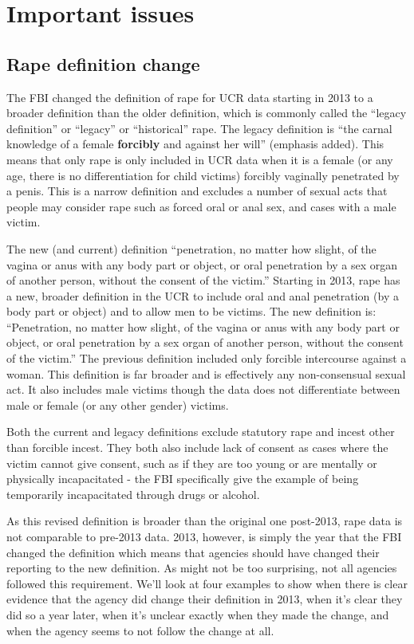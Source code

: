\documentclass[
  12pt,
  openany]{book}
\begin{document}
\hypertarget{important-issues}{%
\section{Important issues}\label{important-issues}}

\hypertarget{rape-definition-change}{%
\subsection{Rape definition change}\label{rape-definition-change}}

The FBI changed the definition of rape for UCR data starting in 2013 to a broader definition than the older definition, which is commonly called the ``legacy definition'' or ``legacy'' or ``historical'' rape. The legacy definition is ``the carnal knowledge of a female \textbf{forcibly} and against her will'' (emphasis added). This means that only rape is only included in UCR data when it is a female (or any age, there is no differentiation for child victims) forcibly vaginally penetrated by a penis. This is a narrow definition and excludes a number of sexual acts that people may consider rape such as forced oral or anal sex, and cases with a male victim.

The new (and current) definition ``penetration, no matter how slight, of the vagina or anus with any body part or object, or oral penetration by a sex organ of another person, without the consent of the victim.'' Starting in 2013, rape has a new, broader definition in the UCR to include oral and anal penetration (by a body part or object) and to allow men to be victims. The new definition is: ``Penetration, no matter how slight, of the vagina or anus with any body part or object, or oral penetration by a sex organ of another person, without the consent of the victim.'' The previous definition included only forcible intercourse against a woman. This definition is far broader and is effectively any non-consensual sexual act. It also includes male victims though the data does not differentiate between male or female (or any other gender) victims.

Both the current and legacy definitions exclude statutory rape and incest other than forcible incest. They both also include lack of consent as cases where the victim cannot give consent, such as if they are too young or are mentally or physically incapacitated - the FBI specifically give the example of being temporarily incapacitated through drugs or alcohol.

As this revised definition is broader than the original one post-2013, rape data is not comparable to pre-2013 data. 2013, however, is simply the year that the FBI changed the definition which means that agencies should have changed their reporting to the new definition. As might not be too surprising, not all agencies followed this requirement. We'll look at four examples to show when there is clear evidence that the agency did change their definition in 2013, when it's clear they did so a year later, when it's unclear exactly when they made the change, and when the agency seems to not follow the change at all.
\end{document}
